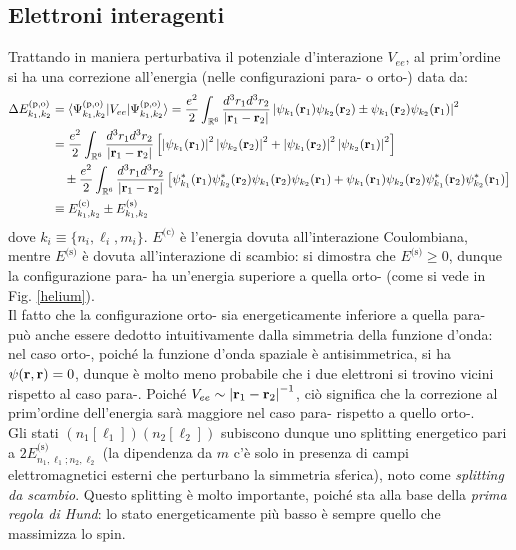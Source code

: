 \subsection{Elettroni interagenti}
\label{he-inter-electr}

Trattando in maniera perturbativa il potenziale d'interazione $ V_{ee} $, al prim'ordine si ha una correzione all'energia (nelle configurazioni para- o orto-) data da:
\begin{equation*}
	\begin{split}
		\Delta E_{k_1,k_2}^\text{(p,o)}
		& = \braket{\Psi_{k_1,k_2}^\text{(p,o)} | V_{ee} | \Psi_{k_1,k_2}^\text{(p,o)}} = \frac{e^2}{2} \int_{\mathbb{R}^6} \frac{d^3r_1 d^3r_2}{\left\lvert\mathbf{r}_1 - \mathbf{r}_2\right\rvert}  \left\lvert\psi_{k_1}(\mathbf{r}_1) \psi_{k_2}(\mathbf{r}_2) \pm \psi_{k_1}(\mathbf{r}_2) \psi_{k_2}(\mathbf{r}_1)\right\rvert^2 \\
		& = \frac{e^2}{2} \int_{\mathbb{R}^6} \frac{d^3r_1 d^3r_2}{\left\lvert\mathbf{r}_1 - \mathbf{r}_2\right\rvert} \left[ \left\lvert\psi_{k_1}(\mathbf{r}_1)\right\rvert^2 \left\lvert\psi_{k_2}(\mathbf{r}_2)\right\rvert^2 + \left\lvert\psi_{k_1}(\mathbf{r}_2)\right\rvert^2 \left\lvert\psi_{k_2}(\mathbf{r}_1)\right\rvert^2 \right] \\
		& \quad \pm \frac{e^2}{2} \int_{\mathbb{R}^6} \frac{d^3r_1 d^3r_2}{\left\lvert\mathbf{r}_1 - \mathbf{r}_2\right\rvert} \left[ \psi_{k_1}^*(\mathbf{r}_1) \psi_{k_2}^*(\mathbf{r}_2) \psi_{k_1}(\mathbf{r}_2) \psi_{k_2}(\mathbf{r}_1) + \psi_{k_1}(\mathbf{r}_1) \psi_{k_2}(\mathbf{r}_2) \psi_{k_1}^*(\mathbf{r}_2) \psi_{k_2}^*(\mathbf{r}_1) \right] \\
		& \equiv E_{k_1,k_2}^\text{(c)} \pm E_{k_1,k_2}^\text{(s)}
	\end{split}
\end{equation*}
dove $ k_i \equiv \{n_i,\ell_i,m_i\} $. $ E^\text{(c)} $ è l'energia dovuta all'interazione Coulombiana, mentre $ E^\text{(s)} $ è dovuta all'interazione di scambio: si dimostra che $ E^\text{(s)} \ge 0 $, dunque la configurazione para- ha un'energia superiore a quella orto- (come si vede in Fig. \ref{helium}). \\
Il fatto che la configurazione orto- sia energeticamente inferiore a quella para- può anche essere dedotto intuitivamente dalla simmetria della funzione d'onda: nel caso orto-, poiché la funzione d'onda spaziale è antisimmetrica, si ha $ \psi(\mathbf{r},\mathbf{r}) = 0 $, dunque è molto meno probabile che i due elettroni si trovino vicini rispetto al caso para-. Poiché $ V_{ee} \sim \left\lvert\mathbf{r}_1 - \mathbf{r}_2\right\rvert^{-1} $, ciò significa che la correzione al prim'ordine dell'energia sarà maggiore nel caso para- rispetto a quello orto-. \\
Gli stati $ (n_1[\ell_1])(n_2[\ell_2]) $ subiscono dunque uno splitting energetico pari a $ 2E^\text{(s)}_{n_1,\ell_1 ; n_2,\ell_2} $ (la dipendenza da $ m $ c'è solo in presenza di campi elettromagnetici esterni che perturbano la simmetria sferica), noto come \textit{splitting da scambio}. Questo splitting è molto importante, poiché sta alla base della \textit{prima regola di Hund}: lo stato energeticamente più basso è sempre quello che massimizza lo spin\footnotemark.


